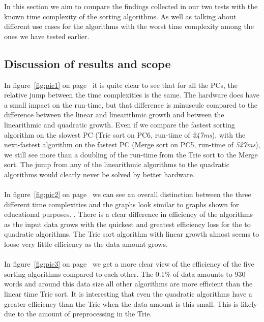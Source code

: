 
In this section we aim to compare the findings collected in our two tests with the known time complexity of the sorting algorithms. As well as talking about different use cases for the algorithms with the worst time complexity among the ones we have tested earlier.

\vspace{0.5cm}
\subsection{Discussion of results and scope}
\label{sec:5.1}


In figure~\ref{fig:pic1} on page~\pageref{fig:pic1} it is quite clear to see that for all the PCs, the relative jump between the time complexities is the same. The hardware does have a small impact on the run-time, but that difference is minuscule compared to the difference between the linear and linearithmic growth and between the linearithmic and quadratic growth. Even if we compare the fastest sorting algorithm on the slowest PC (Trie sort on PC6, run-time of \emph{247ms}), with the next-fastest algorithm on the fastest PC (Merge sort on PC5, run-time of \emph{527ms}), we still see more than a doubling of the run-time from the Trie sort to the Merge sort. The jump from any of the linearithmic algorithms to the quadratic algorithms would clearly never be solved by better hardware.
\\
\\
In figure~\ref{fig:pic2} on page~\pageref{fig:pic2} we can see an overall distinction between the three different time complexities and the graphs look similar to graphs shown for educational purposes. \cite{bigOgraph}. There is a clear difference in efficiency of the algorithms as the input data grows with the quickest and greatest efficiency loss for the to quadratic algorithms. The Trie sort algorithm with linear growth almost seems to loose very little efficiency as the data amount grows. 
\\
\\
In figure~\ref{fig:pic3} on page~\pageref{fig:pic3} we get a more clear view of the efficiency of the five sorting algorithms compared to each other. The 0.1\% of data amounts to 930 words and around this data size all other algorithms are more efficient than the linear time Trie sort. It is interesting that even the quadratic algorithms have a greater efficiency than the Trie when the data amount is this small. This is likely due to the amount of preprocessing in the Trie.
\\
